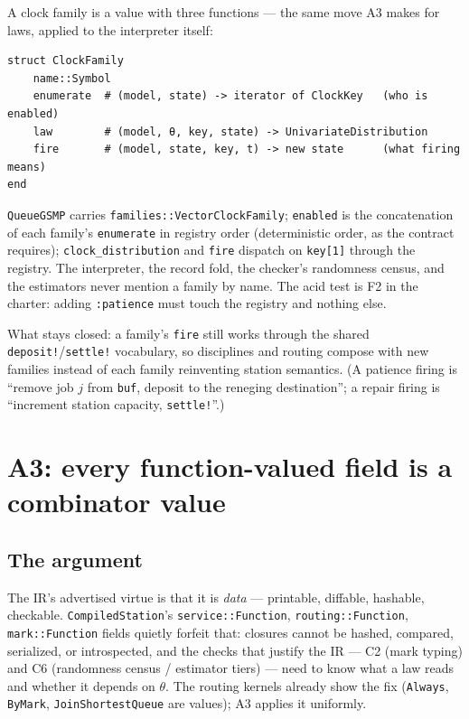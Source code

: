 \documentclass[11pt]{article}
\newcommand{\code}[1]{\texttt{#1}}
\begin{document}
A clock family is a value with three functions --- the same move A3 makes
for laws, applied to the interpreter itself:

\begin{lstlisting}
struct ClockFamily
    name::Symbol
    enumerate  # (model, state) -> iterator of ClockKey   (who is enabled)
    law        # (model, θ, key, state) -> UnivariateDistribution
    fire       # (model, state, key, t) -> new state      (what firing means)
end
\end{lstlisting}

\code{QueueGSMP} carries \code{families::Vector{ClockFamily}};
\code{enabled} is the concatenation of each family's \code{enumerate} in
registry order (deterministic order, as the contract requires);
\code{clock\_distribution} and \code{fire} dispatch on \code{key[1]} through
the registry. The interpreter, the record fold, the checker's randomness
census, and the estimators never mention a family by name. The acid test is
F2 in the charter: adding \code{:patience} must touch the registry and
nothing else.

What stays closed: a family's \code{fire} still works through the shared
\code{deposit!}/\code{settle!} vocabulary, so disciplines and routing
compose with new families instead of each family reinventing station
semantics. (A patience firing is ``remove job $j$ from \code{buf}, deposit
to the reneging destination''; a repair firing is ``increment station
capacity, \code{settle!}''.)

\section{A3: every function-valued field is a combinator value}
\label{sec:a3}

\subsection{The argument}

The IR's advertised virtue is that it is \emph{data} --- printable,
diffable, hashable, checkable. \code{CompiledStation}'s
\code{service::Function}, \code{routing::Function}, \code{mark::Function}
fields quietly forfeit that: closures cannot be hashed, compared,
serialized, or introspected, and the checks that justify the IR ---
C2 (mark typing) and C6 (randomness census / estimator tiers) --- need to
know what a law reads and whether it depends on $\theta$. The routing
kernels already show the fix (\code{Always}, \code{ByMark},
\code{JoinShortestQueue} are values); A3 applies it uniformly.
\end{document}
